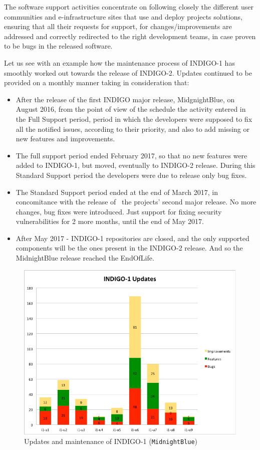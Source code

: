 \documentclass{article}
\begin{document}
The software support activities concentrate on following closely the different user communities and e-infrastructure sites that use and deploy projects solutions, ensuring that all their requests for support, for changes/improvements are addressed and correctly redirected to the right development teams, in case proven to be bugs in the released software.

Let us see with an example how the maintenance process of INDIGO-1 has smoothly worked out towards the release of INDIGO-2. Updates continued to be provided on a monthly manner taking in consideration that:

\begin{itemize}
\item After the release of the first INDIGO major release, MidgnightBlue, on August 2016, from the point of view of the schedule the activity entered in the Full Support period, period in which the developers were supposed to fix all the notified issues, according to their priority, and also to add missing or new features and improvements.
\item The full support period ended February 2017, so that no new features were added to INDIGO-1, but moved, eventually to INDIGO-2 release. During this Standard Support period the developers were due to release only bug fixes.
\item The Standard Support period ended at the end of March 2017, in concomitance with the release of  the projects’ second major release. No more changes, bug fixes were introduced. Just support for fixing security vulnerabilities for 2 more months, until the end of May 2017.
\item After May 2017 - INDIGO-1 repositories are closed, and the only supported components will be the ones present in the INDIGO-2 release. And so the MidnightBlue release reached the EndOfLife.
\end{itemize}


\begin{figure}
  \centering
  \includegraphics[width=\textwidth]{./figs/Figure9.pdf}
  \caption{Updates and maintenance of INDIGO-1 ({\tt MidnightBlue})}
  \label{fig:9}
\end{figure}
\end{document}
